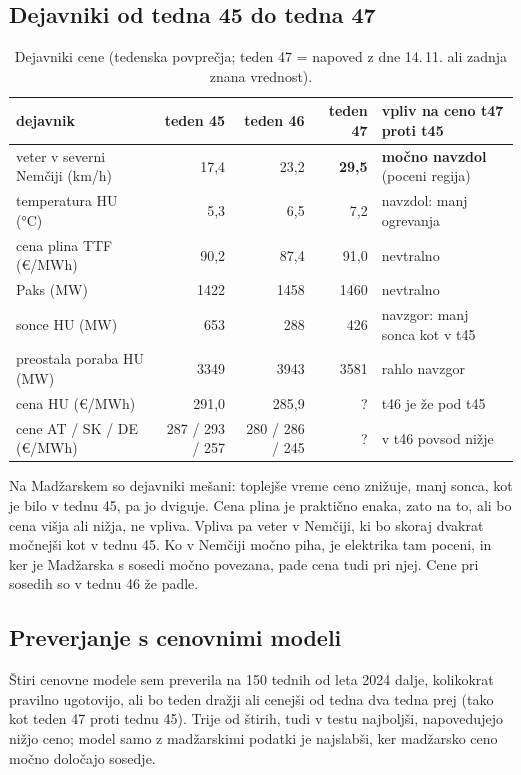 \documentclass[10pt,a4paper]{article}
\begin{document}
\subsection*{Dejavniki od tedna 45 do tedna 47}

\begin{table}[H]
\centering\footnotesize

\footnotesize\setlength{\tabcolsep}{4pt}
\begin{tabular}{lrrrl}
\toprule
dejavnik & teden 45 & teden 46 & teden 47 & vpliv na ceno t47 proti t45 \\
\midrule
veter v severni Nemčiji (km/h) & 17,4 & 23,2 & \textbf{29,5} & \textbf{močno navzdol} (poceni regija) \\
temperatura HU (°C) & 5,3 & 6,5 & 7,2 & navzdol: manj ogrevanja \\
cena plina TTF (€/MWh) & 90,2 & 87,4 & 91,0 & nevtralno \\
Paks (MW) & 1422 & 1458 & 1460 & nevtralno \\
sonce HU (MW) & 653 & 288 & 426 & navzgor: manj sonca kot v t45 \\
preostala poraba HU (MW) & 3349 & 3943 & 3581 & rahlo navzgor \\
cena HU (€/MWh) & 291,0 & 285,9 & ? & t46 je že pod t45 \\
cene AT / SK / DE (€/MWh) & 287 / 293 / 257 & 280 / 286 / 245 & ? & v t46 povsod nižje \\
\bottomrule
\end{tabular}
\caption{Dejavniki cene (tedenska povprečja; teden 47 = napoved z dne 14.\,11. ali zadnja znana vrednost).}
\end{table}

Na Madžarskem so dejavniki mešani: toplejše vreme ceno znižuje, manj sonca, kot je bilo v tednu 45, pa jo
dviguje. Cena plina je praktično enaka, zato na to, ali bo cena višja ali nižja, ne vpliva. Vpliva pa veter v
Nemčiji, ki bo skoraj dvakrat močnejši kot v tednu 45. Ko v Nemčiji močno piha, je elektrika tam poceni, in ker je
Madžarska s sosedi močno povezana, pade cena tudi pri njej. Cene pri sosedih so v tednu 46 že padle.

\subsection*{Preverjanje s cenovnimi modeli}

Štiri cenovne modele sem preverila na 150 tednih od leta 2024 dalje, kolikokrat pravilno ugotovijo, ali bo teden
dražji ali cenejši od tedna dva tedna prej (tako kot teden 47 proti tednu 45). Trije od štirih, tudi v testu
najboljši, napovedujejo nižjo ceno; model samo z madžarskimi podatki je najslabši, ker madžarsko ceno močno
določajo sosedje.
\end{document}
